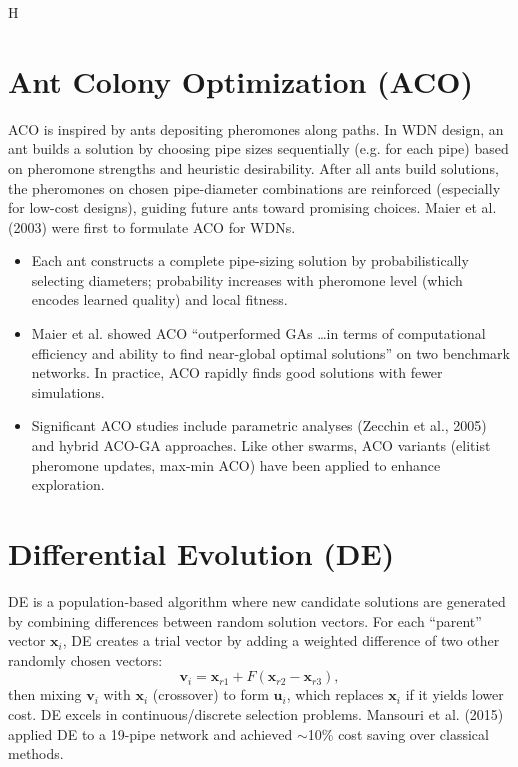 H\documentclass[12pt, a4paper]{article}
\begin{document}
\section*{Ant Colony Optimization (ACO)}
ACO is inspired by ants depositing pheromones along paths. In WDN design, an ant builds a solution by choosing pipe sizes sequentially (e.g. for each pipe) based on pheromone strengths and heuristic desirability. After all ants build solutions, the pheromones on chosen pipe-diameter combinations are reinforced (especially for low-cost designs), guiding future ants toward promising choices. Maier et al. (2003) were first to formulate ACO for WDNs\cite{ref6}.

\begin{itemize}
    \item Each ant constructs a complete pipe-sizing solution by probabilistically selecting diameters; probability increases with pheromone level (which encodes learned quality) and local fitness.
    \item Maier et al. showed ACO ``outperformed GAs \dots in terms of computational efficiency and ability to find near-global optimal solutions'' on two benchmark networks\cite{ref6}. In practice, ACO rapidly finds good solutions with fewer simulations.
    \item Significant ACO studies include parametric analyses (Zecchin et al., 2005) and hybrid ACO-GA approaches. Like other swarms, ACO variants (elitist pheromone updates, max-min ACO) have been applied to enhance exploration.
\end{itemize}

\section*{Differential Evolution (DE)}
DE is a population-based algorithm where new candidate solutions are generated by combining differences between random solution vectors. For each ``parent'' vector $\mathbf{x}_i$, DE creates a trial vector by adding a weighted difference of two other randomly chosen vectors: 
$$\mathbf{v}_i = \mathbf{x}_{r1} + F(\mathbf{x}_{r2}-\mathbf{x}_{r3}),$$ 
then mixing $\mathbf{v}_i$ with $\mathbf{x}_i$ (crossover) to form $\mathbf{u}_i$, which replaces $\mathbf{x}_i$ if it yields lower cost. DE excels in continuous/discrete selection problems. Mansouri et al. (2015) applied DE to a 19-pipe network and achieved $\sim$10\% cost saving over classical methods\cite{ref7}.
\end{document}
